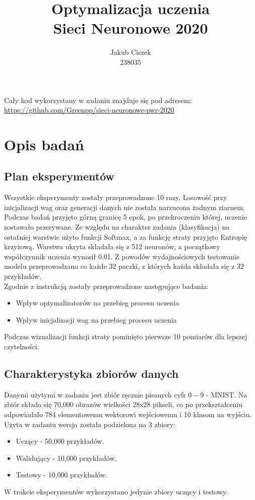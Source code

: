 \documentclass{article}
\title{  Optymalizacja uczenia\\Sieci Neuronowe 2020 }
\author{
  Jakub Ciszek \\
  238035\\
}
\begin{document}
\maketitle

\newpage
\tableofcontents
\newpage

Cały kod wykorzystany w zadaniu znajduje się pod adresem: \url{https://github.com/Greenpp/sieci-neuronowe-pwr-2020}

\section{Opis badań}
\subsection{Plan eksperymentów}

Wszystkie eksperymenty zostały przeprowadzone 10 razy. Losowość przy inicjalizacji wag oraz generacji danych nie została narzucona żadnym ziarnem. Podczas badań przyjęto górną granicę 5 epok, po przekroczeniu której, uczenie zostawało przerywane. Ze względu na charakter zadania (klasyfikacja) na ostatniej warstwie użyto funkcji Softmax, a za funkcję straty przyjęto Entropię krzyżową. Warstwa ukryta składała się z 512 neuronów, a początkowy współczynnik uczenia wynosił 0.01.
Z powodów wydajnościowych testowanie modelu przeprowadzano co każde 32 paczki, z których każda składała się z 32 przykładów.\\
Zgodnie z instrukcją zostały przeprowadzone następujące badania:
\begin{itemize}
	\item Wpływ optymalizatorów na przebieg procesu uczenia
	\item Wpływ inicjalizacji wag na przebieg procesu uczenia 
\end{itemize}
Podczas wizualizacji funkcji straty pominięto pierwsze 10 pomiarów dla lepszej czytelności.

\subsection{Charakterystyka zbiorów danych}

Danymi użytymi w zadaniu jest zbiór ręcznie pisanych cyfr \(0-9\) - MNIST. Na zbiór składa się 70,000 obrazów wielkości 28x28 pikseli, co po przekształceniu odpowiadało 784 elementowemu wektorowi wejściowemu i 10 klasom na wyjściu. Użyta w zadaniu wersja została podzielona na 3 zbiory:
\begin{itemize}
	\item Uczący - 50,000 przykładów.
	\item Walidujący - 10,000 przykładów.
	\item Testowy - 10,000 przykładów.
\end{itemize}
W trakcie eksperymentów wykorzystano jedynie zbiory uczący i testowy.
\end{document}
